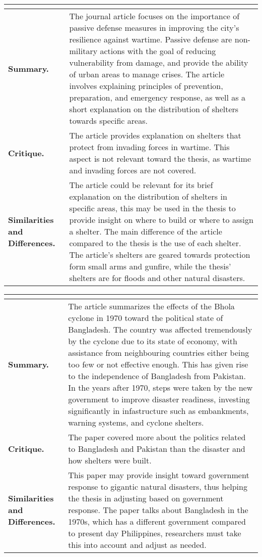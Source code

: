 \begin{longtable}{|L{.2\linewidth}|L{.74\linewidth}|}
	\hline
	\\ \hline
	\textbf{Summary.} & The journal article focuses on the importance of passive defense measures in improving the city's resilience against wartime. Passive defense are non-military actions with the goal of reducing vulnerability from damage, and provide the ability of urban areas to manage crises. The article involves explaining principles of prevention, preparation, and emergency response, as well as a short explanation on the distribution of shelters towards specific areas.\\ \hline
	\textbf{Critique.} & The article provides explanation on shelters that protect from invading forces in wartime. This aspect is not relevant toward the thesis, as wartime and invading forces are not covered.\\ \hline
	\textbf{Similarities and Differences.} & The article could be relevant for its brief explanation on the distribution of shelters in specific areas, this may be used in the thesis to provide insight on where to build or where to assign a shelter. The main difference of the article compared to the thesis is the use of each shelter. The article's shelters are geared towards protection form small arms and gunfire, while the thesis' shelters are for floods and other natural disasters. \\ \hline
\end{longtable}

\begin{longtable}{|L{.2\linewidth}|L{.74\linewidth}|}
	\hline
	\\ \hline
	\textbf{Summary.} & The article summarizes the effects of the Bhola cyclone in 1970 toward the political state of Bangladesh. The country was affected tremendously by the cyclone due to its state of economy, with assistance from neighbouring countries either being too few or not effective enough. This has given rise to the independence of Bangladesh from Pakistan. In the years after 1970, steps were taken by the new government to improve disaster readiness, investing significantly in infastructure such as embankments, warning systems, and cyclone shelters. \\ \hline
	\textbf{Critique.} & The paper covered more about the politics related to Bangladesh and Pakistan than the disaster and how shelters were built.\\ \hline
	\textbf{Similarities and Differences.} & This paper may provide insight toward government response to gigantic natural disasters, thus helping the thesis in adjusting based on government response. The paper talks about Bangladesh in the 1970s, which has a different government compared to present day Philippines, researchers must take this into account and adjust as needed.\\ \hline
\end{longtable}

